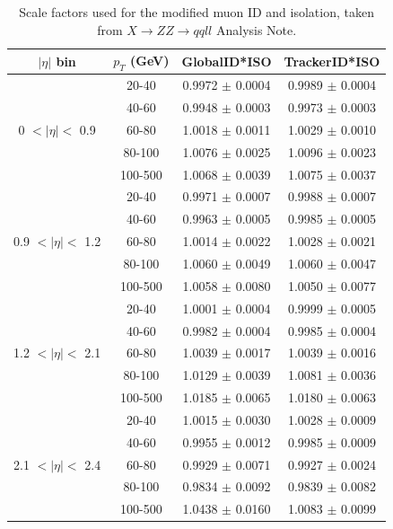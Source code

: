 \begin{table}[h!]
\begin{center}
    \begin{tabular}{|c|c|c|c|}
    \hline
    $|\eta|$ bin & $p_{T}$ (GeV) & GlobalID*ISO & TrackerID*ISO \\
    \hline
    \multirow{5}{*}{0 $< |\eta| <$ 0.9} & 20-40 & 0.9972 $\pm$ 0.0004 & 0.9989 $\pm$ 0.0004 \\
    & 40-60 & 0.9948 $\pm$ 0.0003 & 0.9973 $\pm$ 0.0003 \\
    & 60-80 & 1.0018 $\pm$ 0.0011 & 1.0029 $\pm$ 0.0010 \\
    & 80-100 & 1.0076 $\pm$ 0.0025 & 1.0096 $\pm$ 0.0023 \\
    & 100-500 & 1.0068 $\pm$ 0.0039 & 1.0075 $\pm$ 0.0037 \\
    \hline
    \multirow{5}{*}{0.9 $< |\eta| <$ 1.2} & 20-40 & 0.9971 $\pm$ 0.0007 & 0.9988 $\pm$ 0.0007 \\
    & 40-60 & 0.9963 $\pm$ 0.0005 & 0.9985 $\pm$ 0.0005 \\
    & 60-80 & 1.0014 $\pm$ 0.0022 & 1.0028 $\pm$ 0.0021 \\
    & 80-100 & 1.0060 $\pm$ 0.0049 & 1.0060 $\pm$ 0.0047 \\
    & 100-500 & 1.0058 $\pm$ 0.0080 & 1.0050 $\pm$ 0.0077 \\
    \hline
    \multirow{5}{*}{1.2 $< |\eta| <$ 2.1} & 20-40 & 1.0001 $\pm$ 0.0004 & 0.9999 $\pm$ 0.0005 \\
    & 40-60 & 0.9982 $\pm$ 0.0004 & 0.9985 $\pm$ 0.0004 \\
    & 60-80 & 1.0039 $\pm$ 0.0017 & 1.0039 $\pm$ 0.0016 \\
    & 80-100 & 1.0129 $\pm$ 0.0039 & 1.0081 $\pm$ 0.0036 \\
    & 100-500 & 1.0185 $\pm$ 0.0065 & 1.0180 $\pm$ 0.0063 \\
    \hline
    \multirow{5}{*}{2.1 $< |\eta| <$ 2.4} & 20-40 & 1.0015 $\pm$ 0.0030 & 1.0028 $\pm$ 0.0009 \\
    & 40-60 & 0.9955 $\pm$ 0.0012 & 0.9985 $\pm$ 0.0009 \\
    & 60-80 & 0.9929 $\pm$ 0.0071 & 0.9927 $\pm$ 0.0024 \\
    & 80-100 & 0.9834 $\pm$ 0.0092 & 0.9839 $\pm$ 0.0082 \\
    & 100-500 & 1.0438 $\pm$ 0.0160 & 1.0083 $\pm$ 0.0099 \\
    \hline
    \end{tabular}
\end{center}
\caption{\label{tab:SF_ModMu}Scale factors used for the modified muon ID and isolation, taken from $X \rightarrow ZZ \rightarrow qqll$ Analysis Note.}
\end{table}

